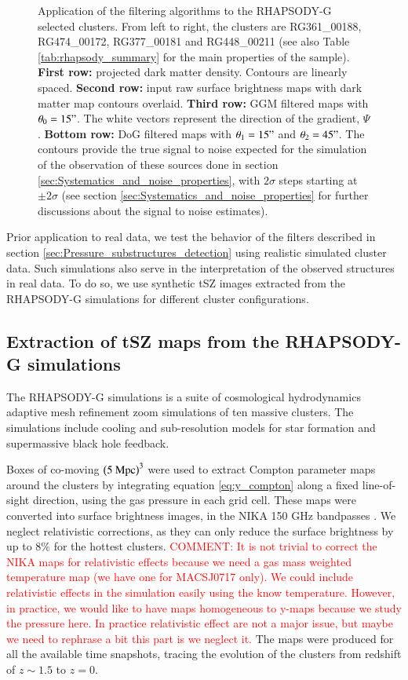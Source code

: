 \documentclass[twocolumn,traditabstract]{aa}
\begin{document}
\begin{figure}[h]
\caption{\footnotesize{Application of the filtering algorithms to the RHAPSODY-G selected clusters. From left to right, the clusters are RG361\_00188, RG474\_00172, RG377\_00181 and RG448\_00211 (see also Table \ref{tab:rhapsody_summary} for the main properties of the sample). {\bf First row:} projected dark matter density. Contours are linearly spaced. {\bf Second row:} input raw surface brightness maps with dark matter map contours overlaid. {\bf Third row:} GGM filtered maps with $\theta_0 = 15"$. The white vectors represent the direction of the gradient, $\Psi$. {\bf Bottom row:} DoG filtered maps with $\theta_1 = 15"$ and $\theta_2 = 45"$. The contours provide the true signal to noise expected for the simulation of the observation of these sources done in section \ref{sec:Systematics_and_noise_properties}, with $2 \sigma$ steps starting at $\pm 2 \sigma$ (see section \ref{sec:Systematics_and_noise_properties} for further discussions about the signal to noise estimates).}}
\label{fig:RG_cluster_sample}
\end{figure}

Prior application to real data, we test the behavior of the filters described in section \ref{sec:Pressure_substructures_detection} using realistic simulated cluster data. Such simulations also serve in the interpretation of the observed structures in real data. To do so, we use synthetic tSZ images extracted from the RHAPSODY-G simulations for different cluster configurations.

\subsection{Extraction of tSZ maps from the RHAPSODY-G simulations}
The RHAPSODY-G simulations \citep{Wu2013,Hahn2017} is a suite of cosmological hydrodynamics adaptive mesh refinement zoom simulations of ten massive clusters. The simulations include cooling and sub-resolution models for star formation and supermassive black hole feedback. 

Boxes of co-moving $\left(5 \ {\rm Mpc}\right)^3$ were used to extract Compton parameter maps around the clusters by integrating equation \ref{eq:y_compton} along a fixed line-of-sight direction, using the gas pressure in each grid cell. These maps were converted into surface brightness images, in the NIKA 150 GHz bandpasses \citep[see the coefficient provided in][]{Adam2016b}. We neglect relativistic corrections, as they can only reduce the surface brightness by up to 8\% for the hottest clusters. \textcolor{red}{COMMENT: It is not trivial to correct the NIKA maps for relativistic effects because we need a gas mass weighted temperature map (we have one for MACSJ0717 only). We could include relativistic effects in the simulation easily using the know temperature. However, in practice, we would like to have maps homogeneous to y-maps because we study the pressure here. In practice relativistic effect are not a major issue, but maybe we need to rephrase a bit this part is we neglect it.} The maps were produced for all the available time snapshots, tracing the evolution of the clusters from redshift of $z \sim 1.5$ to $z=0$.
\end{document}

